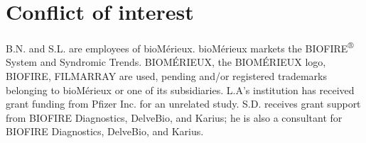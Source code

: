 \documentclass[12pt]{article}
\begin{document}
\section*{Conflict of interest}

B.N. and S.L. are employees of bioMérieux.
bioMérieux markets the BIOFIRE\textsuperscript{®} System and Syndromic Trends. 
BIOMÉRIEUX, the BIOMÉRIEUX logo, BIOFIRE, FILMARRAY are used, pending and/or registered trademarks belonging to bioMérieux or one of its subsidiaries.
L.A's institution has received grant funding from Pfizer Inc. for an unrelated study.
S.D. receives grant support from BIOFIRE Diagnostics, DelveBio, and Karius; he is also a consultant for BIOFIRE Diagnostics, DelveBio, and Karius.


\end{document}
